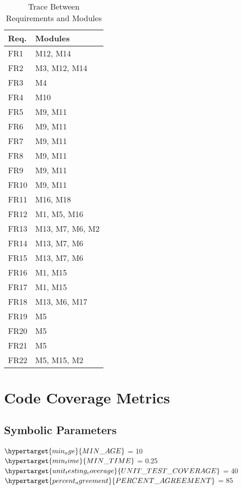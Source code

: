 \documentclass[12pt, titlepage]{article}
\begin{document}
	\begin{table}[H]
	\centering
	\begin{tabular}{p{} p{}}
		\toprule
		\textbf{Req.} & \textbf{Modules}\\
		\midrule
		FR1 & M12, M14\\
		FR2 & M3, M12, M14\\
		FR3 & M4\\
		FR4 & M10\\
		FR5 & M9, M11\\
		FR6 & M9, M11\\
		FR7 & M9, M11\\
		FR8 & M9, M11\\
		FR9 & M9, M11\\
		FR10 & M9, M11\\
		FR11 & M16, M18\\
		FR12 &  M1, M5, M16\\
		FR13 & M13, M7, M6, M2\\
		FR14 & M13, M7, M6\\
		FR15 & M13, M7, M6\\
		FR16 & M1, M15\\
		FR17 & M1, M15\\
		FR18 & M13, M6, M17\\
		FR19 & M5\\
		FR20 & M5\\
		FR21 & M5\\
		FR22 & M5, M15, M2\\
		
		\bottomrule
	\end{tabular}
	\caption{Trace Between Requirements and Modules}
	\label{TblRT}
\end{table}
	

\section{Code Coverage Metrics}

\subsection{Symbolic Parameters}

$\hypertarget{min_age}{MIN\_AGE}$ = 10\\
$\hypertarget{min_time}{MIN\_TIME}$ = 0.25\\
$\hypertarget{unit_testing_coverage}{UNIT\_TEST\_COVERAGE}$ = 40\\
$\hypertarget{percent_agreement}{PERCENT\_AGREEMENT}$ = 85\\




\end{document}
